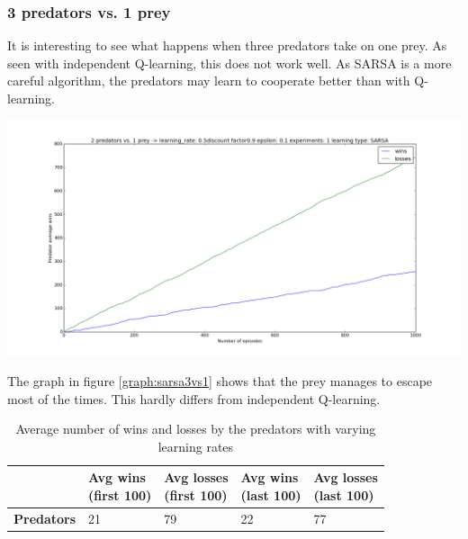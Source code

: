 \subsubsection{3 predators vs. 1 prey}
It is interesting to see what happens when three predators take on one prey. As seen with independent Q-learning, this does not work well. As SARSA is a more careful algorithm, the predators may learn to cooperate better than with Q-learning.

\begin{center}
	\includegraphics[scale=0.3]{3_predators_SARSA}
	\label{graph:sarsa3vs1}
\end{center}


The graph in figure \ref{graph:sarsa3vs1} shows that the prey manages to escape most of the times. \: This hardly differs from independent Q-learning.

\begin{table}[H]
\begin{center}
\begin{tabular}{| l | l | l | l | l |}
\hline
 & \parbox{2cm}{\textbf{Avg wins \\ (first 100)}} & \parbox{2cm}{\textbf{Avg losses \\ (first 100)}} & \parbox{2cm}{\textbf{Avg wins \\ (last 100)}} & \parbox{2cm}{\textbf{Avg losses \\ (last 100)}} \\
\hline
\textbf{Predators} & 21 & 79 & 22 & 77 \\
\hline
\end{tabular}
\caption{Average number of wins and losses by the predators with varying learning rates}
\end{center}
\end{table}

